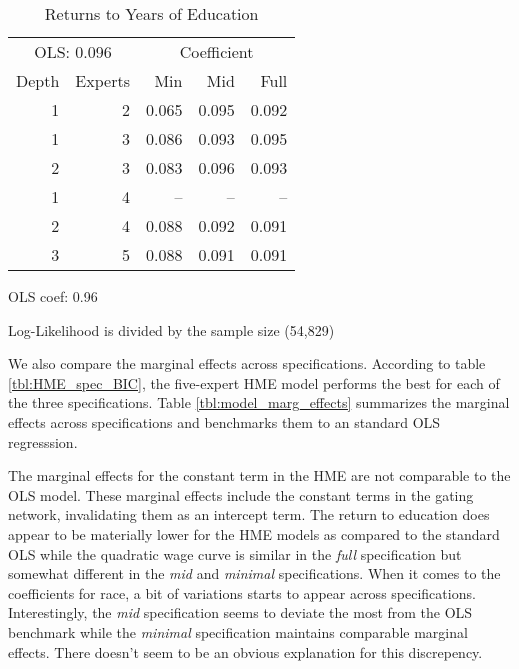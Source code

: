 \documentclass[12pt]{article}
\begin{document}
\begin{table} \centering
  \caption{Returns to Years of Education}
  \begin{threeparttable}
    \begin{tabular}[l]{r r r r r}
  \cmidrule{1-5}
  \multicolumn{2}{c}{OLS: 0.096}   & \multicolumn{3}{c}{Coefficient} \\ 
  \cmidrule(r){3-5}
  Depth & Experts & Min   & Mid   & Full       \\
  \cmidrule{1-5}

  1     & 2       & 0.065 & 0.095 & 0.092      \\
  1     & 3       & 0.086 & 0.093 & 0.095     \\
  2     & 3       & 0.083 & 0.096 & 0.093      \\
  1     & 4       & --    & --    & --         \\
  2     & 4       & 0.088 & 0.092 & 0.091      \\
  3     & 5       & 0.088 & 0.091 & 0.091      \\

  \hline
    \end{tabular}
    \begin{tablenotes}
      \item{\footnotesize OLS coef: 0.96}
      \item{\footnotesize Log-Likelihood is divided by the sample size (54,829)}
    \end{tablenotes} \label{tbl:YrsEdu_coef}
  \end{threeparttable}
\end{table}

We also compare the marginal effects across specifications. According to table
\ref{tbl:HME_spec_BIC}, the five-expert HME model performs the best for each
of the three specifications. Table \ref{tbl:model_marg_effects} summarizes
the marginal effects across specifications and benchmarks them to an standard
OLS regresssion.

The marginal effects for the constant term in the HME are not comparable
to the OLS model. These marginal effects include the constant terms in the
gating network, invalidating them as an intercept term. The return to
education does appear to be materially lower for the HME models as
compared to the standard OLS while the quadratic wage curve is similar
in the \textit{full} specification but somewhat different in the
\textit{mid} and \textit{minimal} specifications. When it comes to
the coefficients for race, a bit of variations starts to appear
across specifications. Interestingly, the \textit{mid} specification
seems to deviate the most from the OLS benchmark while the
\textit{minimal} specification maintains comparable marginal effects.
There doesn't seem to be an obvious explanation for this discrepency. 
\end{document}
